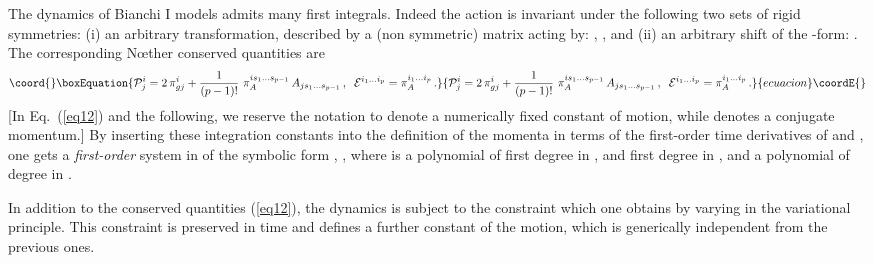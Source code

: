 \documentclass[a4paper,12pt]{article}
\begin{document}
The dynamics of Bianchi I models
admits many first integrals. Indeed the action \coordHE{} is invariant under 
the following two sets of rigid symmetries: (i) an arbitrary \coordHE{} transformation, described by a (non symmetric) \coordHE{} matrix 
\coordHE{} acting by: \coordHE{}, \coordHE{}, and (ii) an arbitrary shift 
of the \coordHE{}-form: \coordHE{}. The corresponding N\oe ther conserved 
quantities are 
\begin{equation}\coord{}\boxEquation{
{\cal P}_j^i = 2 \, \pi_{gj}^i + \frac{1}{(p-1)!} \ \pi_A^{is_1 \ldots 
s_{p-1}} \, A_{j s_1 \ldots s_{p-1}} \, ,  \; \; 
{\cal E}^{i_1 \ldots i_p} = \pi_A^{i_1 \ldots i_p} \,. 
\label{eq12}
}{
{\cal P}_j^i = 2 \, \pi_{gj}^i + \frac{1}{(p-1)!} \ \pi_A^{is_1 \ldots 
s_{p-1}} \, A_{j s_1 \ldots s_{p-1}} \, ,  \; \; 
{\cal E}^{i_1 \ldots i_p} = \pi_A^{i_1 \ldots i_p} \,. 
}{ecuacion}\coordE{}\end{equation}
[In Eq.~(\ref{eq12}) and the following, we reserve the notation \coordHE{} to denote a numerically fixed constant of motion, while 
\coordHE{} denotes a conjugate momentum.] 
By inserting these integration constants into the definition
of the momenta in terms of the first-order time derivatives
of \coordHE{} and \coordHE{}, 
one gets a {\it first-order} system in \coordHE{}
of the symbolic form \coordHE{},
\coordHE{}, where \coordHE{} is a polynomial
of first degree in \coordHE{}, and first degree in \coordHE{}, and \coordHE{} a
polynomial of degree \coordHE{} in \coordHE{}.
 
In addition to the conserved quantities (\ref{eq12}), the dynamics 
is subject to the constraint
\coordHE{}
which one obtains by varying \coordHE{} in the
variational principle.  This constraint is preserved
in time and defines a further constant of the motion, which
is generically independent from the previous ones.
\end{document}
